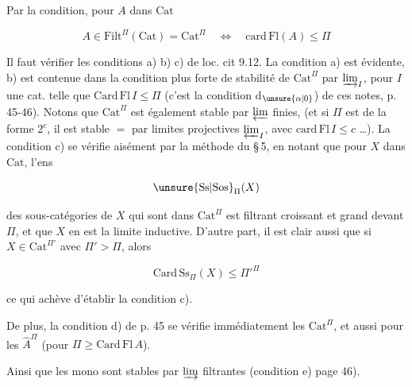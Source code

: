 

Par la condition, pour $A$ dans $\mathrm{Cat}$

\[
A\in\mathrm{Filt}^{\Pi}(\mathrm{Cat})=\mathrm{Cat}^{\Pi}\quad\Longleftrightarrow\quad\mathrm{card}\,\mathrm{Fl}(A)\leq\Pi\tag*{(8.4)}
\]

Il faut vérifier  les conditions a) b) c) de loc. cit 9.12. La condition a) est évidente, b) est contenue dans la condition plus forte de stabilité de $\mathrm{Cat}^{\Pi}$ par $\varinjlim_I$, pour $I$ une cat. telle que $\mathrm{Card}\,\mathrm{Fl}\,I\leq\Pi$ (c'est la condition d$_{\unsure{\alpha|0}}$) de ces notes, p. 45-46). Notons que $\mathrm{Cat}^{\Pi}$ est également stable par $\varprojlim$ finies, (et si $\Pi$ est de la forme $2^c$, il est stable $=$ par limites projectives $\varprojlim_I$, avec $\mathrm{card}\,\mathrm{Fl}\,I\leq c$ \ldots). La condition c) se vérifie aisément par la méthode du \S\,5, en notant que pour $X$ dans $\mathrm{Cat}$, l'ens

\[
\unsure{\mathrm{Ss}|\mathrm{Sos}}_{\Pi}(X)
\]

des sous-catégories de $X$ qui sont dans $\mathrm{Cat}^{\Pi}$ est filtrant croissant et grand devant $\Pi$, et que $X$ en est la limite inductive. D'autre part, il est clair aussi que si $X\in\mathrm{Cat}^{\Pi'}$ avec $\Pi'>\Pi$, alors 

\[
\mathrm{Card}\,\mathrm{Ss}_{\Pi}(X)\leq{\Pi'}^{\Pi}
\]

ce qui achève d'établir la condition c).

De plus, la condition d) de p. 45 se vérifie immédiatement  les $\mathrm{Cat}^{\Pi}$, et aussi pour les $\widehat A^{\Pi}$ (pour $\Pi\geq\mathrm{Card}\,\mathrm{Fl}\,A$).

Ainsi que les mono sont stables par $\varinjlim$ filtrantes (condition e) page 46).
